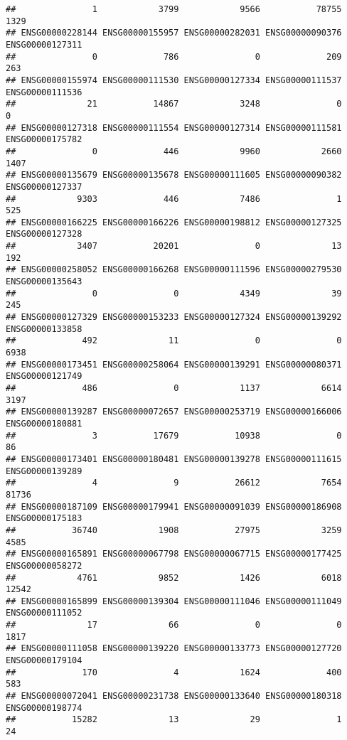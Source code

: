 \documentclass[
]{article}
\begin{document}
\begin{verbatim}
##               1            3799            9566           78755            1329 
## ENSG00000228144 ENSG00000155957 ENSG00000282031 ENSG00000090376 ENSG00000127311 
##               0             786               0             209             263 
## ENSG00000155974 ENSG00000111530 ENSG00000127334 ENSG00000111537 ENSG00000111536 
##              21           14867            3248               0               0 
## ENSG00000127318 ENSG00000111554 ENSG00000127314 ENSG00000111581 ENSG00000175782 
##               0             446            9960            2660            1407 
## ENSG00000135679 ENSG00000135678 ENSG00000111605 ENSG00000090382 ENSG00000127337 
##            9303             446            7486               1             525 
## ENSG00000166225 ENSG00000166226 ENSG00000198812 ENSG00000127325 ENSG00000127328 
##            3407           20201               0              13             192 
## ENSG00000258052 ENSG00000166268 ENSG00000111596 ENSG00000279530 ENSG00000135643 
##               0               0            4349              39             245 
## ENSG00000127329 ENSG00000153233 ENSG00000127324 ENSG00000139292 ENSG00000133858 
##             492              11               0               0            6938 
## ENSG00000173451 ENSG00000258064 ENSG00000139291 ENSG00000080371 ENSG00000121749 
##             486               0            1137            6614            3197 
## ENSG00000139287 ENSG00000072657 ENSG00000253719 ENSG00000166006 ENSG00000180881 
##               3           17679           10938               0              86 
## ENSG00000173401 ENSG00000180481 ENSG00000139278 ENSG00000111615 ENSG00000139289 
##               4               9           26612            7654           81736 
## ENSG00000187109 ENSG00000179941 ENSG00000091039 ENSG00000186908 ENSG00000175183 
##           36740            1908           27975            3259            4585 
## ENSG00000165891 ENSG00000067798 ENSG00000067715 ENSG00000177425 ENSG00000058272 
##            4761            9852            1426            6018           12542 
## ENSG00000165899 ENSG00000139304 ENSG00000111046 ENSG00000111049 ENSG00000111052 
##              17              66               0               0            1817 
## ENSG00000111058 ENSG00000139220 ENSG00000133773 ENSG00000127720 ENSG00000179104 
##             170               4            1624             400             583 
## ENSG00000072041 ENSG00000231738 ENSG00000133640 ENSG00000180318 ENSG00000198774 
##           15282              13              29               1              24 

\end{verbatim}
\end{document}

